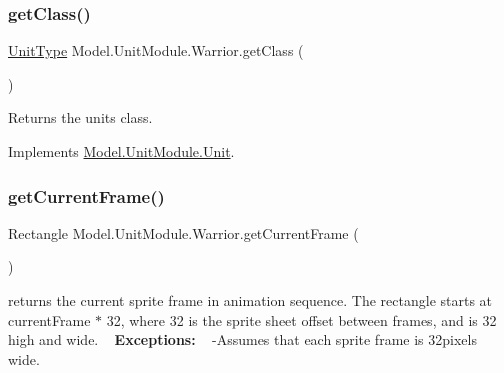 \hypertarget{class_model_1_1_unit_module_1_1_warrior_ad075c71e62a88cc0cd5f93c9600ac952}{}\label{class_model_1_1_unit_module_1_1_warrior_ad075c71e62a88cc0cd5f93c9600ac952} 
\subsubsection{\texorpdfstring{get\+Class()}{getClass()}}
{\footnotesize\ttfamily \hyperlink{namespace_model_1_1_unit_module_aba9769f408747bf38d0d8adca8f68c98}{Unit\+Type} Model.\+Unit\+Module.\+Warrior.\+get\+Class (\begin{DoxyParamCaption}{ }\end{DoxyParamCaption})\hspace{0.3cm}{\ttfamily [inline]}}

Returns the unit\textquotesingle{}s class. 

Implements \hyperlink{interface_model_1_1_unit_module_1_1_unit_a84dbb2982a68ec530e53662d747da9fa}{Model.\+Unit\+Module.\+Unit}.

\hypertarget{class_model_1_1_unit_module_1_1_warrior_ab6a358a386cb1a55b619b8517b084ef7}{}\label{class_model_1_1_unit_module_1_1_warrior_ab6a358a386cb1a55b619b8517b084ef7} 
\subsubsection{\texorpdfstring{get\+Current\+Frame()}{getCurrentFrame()}}
{\footnotesize\ttfamily Rectangle Model.\+Unit\+Module.\+Warrior.\+get\+Current\+Frame (\begin{DoxyParamCaption}{ }\end{DoxyParamCaption})\hspace{0.3cm}{\ttfamily [inline]}}

returns the current sprite frame in animation sequence. The rectangle starts at current\+Frame $\ast$ 32, where 32 is the sprite sheet offset between frames, and is 32 high and wide. ~\newline
 {\bfseries Exceptions\+:} ~\newline
 -\/\+Assumes that each sprite frame is 32pixels wide. 

